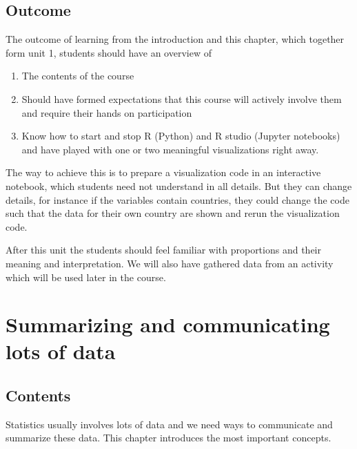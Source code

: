 \documentclass[
  letterpaper,
]{scrbook}
\providecommand{\tightlist}{%
  \setlength{\itemsep}{0pt}\setlength{\parskip}{0pt}}\usepackage{longtable,booktabs,array}
\begin{document}
\hypertarget{outcome}{%
\section{Outcome}\label{outcome}}

The outcome of learning from the introduction and this chapter, which
together form unit 1, students should have an overview of

\begin{enumerate}
\def\labelenumi{\arabic{enumi}.}
\tightlist
\item
  The contents of the course
\item
  Should have formed expectations that this course will actively involve
  them and require their hands on participation
\item
  Know how to start and stop R (Python) and R studio (Jupyter notebooks)
  and have played with one or two meaningful visualizations right away.
\end{enumerate}

The way to achieve this is to prepare a visualization code in an
interactive notebook, which students need not understand in all details.
But they can change details, for instance if the variables contain
countries, they could change the code such that the data for their own
country are shown and rerun the visualization code.

After this unit the students should feel familiar with proportions and
their meaning and interpretation. We will also have gathered data from
an activity which will be used later in the course.


\hypertarget{summarizing-and-communicating-lots-of-data}{%
\chapter{Summarizing and communicating lots of
data}\label{summarizing-and-communicating-lots-of-data}}

\hypertarget{contents-1}{%
\section{Contents}\label{contents-1}}

Statistics usually involves lots of data and we need ways to communicate
and summarize these data. This chapter introduces the most important
concepts.
\end{document}
